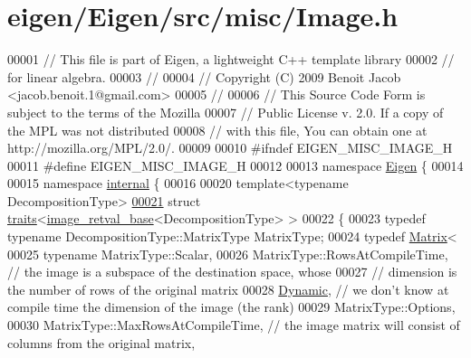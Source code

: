 \hypertarget{eigen_2_eigen_2src_2misc_2_image_8h_source}{}\section{eigen/\+Eigen/src/misc/\+Image.h}
\label{eigen_2_eigen_2src_2misc_2_image_8h_source}

\begin{DoxyCode}
00001 \textcolor{comment}{// This file is part of Eigen, a lightweight C++ template library}
00002 \textcolor{comment}{// for linear algebra.}
00003 \textcolor{comment}{//}
00004 \textcolor{comment}{// Copyright (C) 2009 Benoit Jacob <jacob.benoit.1@gmail.com>}
00005 \textcolor{comment}{//}
00006 \textcolor{comment}{// This Source Code Form is subject to the terms of the Mozilla}
00007 \textcolor{comment}{// Public License v. 2.0. If a copy of the MPL was not distributed}
00008 \textcolor{comment}{// with this file, You can obtain one at http://mozilla.org/MPL/2.0/.}
00009 
00010 \textcolor{preprocessor}{#ifndef EIGEN\_MISC\_IMAGE\_H}
00011 \textcolor{preprocessor}{#define EIGEN\_MISC\_IMAGE\_H}
00012 
00013 \textcolor{keyword}{namespace }\hyperlink{namespace_eigen}{Eigen} \{ 
00014 
00015 \textcolor{keyword}{namespace }\hyperlink{namespaceinternal}{internal} \{
00016 
00020 \textcolor{keyword}{template}<\textcolor{keyword}{typename} DecompositionType>
\hyperlink{struct_eigen_1_1internal_1_1traits_3_01image__retval__base_3_01_decomposition_type_01_4_01_4}{00021} \textcolor{keyword}{struct }\hyperlink{struct_eigen_1_1internal_1_1traits}{traits}<\hyperlink{struct_eigen_1_1internal_1_1image__retval__base}{image\_retval\_base}<DecompositionType> >
00022 \{
00023   \textcolor{keyword}{typedef} \textcolor{keyword}{typename} DecompositionType::MatrixType MatrixType;
00024   \textcolor{keyword}{typedef} \hyperlink{group___core___module_class_eigen_1_1_matrix}{Matrix}<
00025     \textcolor{keyword}{typename} MatrixType::Scalar,
00026     MatrixType::RowsAtCompileTime, \textcolor{comment}{// the image is a subspace of the destination space, whose}
00027                                    \textcolor{comment}{// dimension is the number of rows of the original matrix}
00028     \hyperlink{namespace_eigen_ad81fa7195215a0ce30017dfac309f0b2}{Dynamic},                       \textcolor{comment}{// we don't know at compile time the dimension of the image (the
       rank)}
00029     MatrixType::Options,
00030     MatrixType::MaxRowsAtCompileTime, \textcolor{comment}{// the image matrix will consist of columns from the original matrix,}

\end{DoxyCode}
